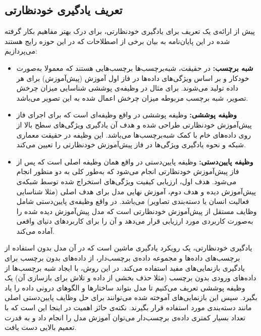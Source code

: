 \subsection{تعریف یادگیری خودنظارتی}

پیش از ارائه‌ی یک تعریف برای یادگیری خودنظارتی، برای درک بهتر مفاهیم بکار گرفته شده در این پایان‌نامه به بیان برخی از اصطلاحات که در این حوزه رایج هستند می‌پردازیم:

\begin{itemize}
    \item \textbf{شبه برچسب:}
    در حقیقت، شبه‌برچسب‌ها برچسب‌هایی هستند که معمولا به‌صورت خودکار و بر اساس ویژگی‌های داده‌ها در فاز اول آموزش (پیش‌آموزش) برای هر داده تولید می‌شوند. برای مثال در وظیفه‌ی پوششی شناسایی میزان چرخش تصویر، شبه برچسب مربوطه میزان چرخش اعمال شده به این تصویر می‌باشد.
    \item \textbf{وظیفه پوششی:}
    وظیفه پوششی در واقع وظیفه‌ای است که برای اجرای فاز پیش‌آموزش خودنظارتی طراحی شده و هدف آن یادگیری ویژگی‌های سطح بالا از روی داده‌های خام با کمک شبه‌برچسب‌ها می‌باشد. این وظیفه در حقیقت معماری شبکه و نحوه یادگیری ویژگی‌ها در فاز پیش‌آموزش خودنظارتی را تعیین می‌کند.
    \item \textbf{وظیفه پایین‌دستی:}
    وظیفه پایین‌دستی در واقع همان وظیفه اصلی است که پس از فاز پیش‌آموزش خودنظارتی انجام می‌شود که به‌طور کلی به دو منظور انجام می‌شود. هدف اول، ارزیابی کیفیت ویژگی‌های استخراج شده توسط شبکه‌ی پیش‌آموزش دیده و هدف دوم، آموزش نهایی مدل برای هدف اصلی (مثلا شناسایی فعالیت انسان یا دسته‌بندی تصاویر) می‌باشد. در واقع وظیفه‌ی پایین‌دستی شامل وظایف مستقل از پیش‌آموزش خودنظارتی است که مدل پیش‌آموزش دیده شده را به‌صورت کاربردی مورد ارزیابی قرار می‌دهد و آن را برای کاربردهای دنیای واقعی آماده می‌کند.
\end{itemize}

یادگیری خودنظارتی، یک رویکرد یادگیری ماشین است که در آن مدل بدون استفاده از برچسب‌های داده‌ها و مجموعه داده‌ی برچسب‌دار، از داده‌های بدون برچسب برای یادگیری بازنمایی‌های مفید استفاده می‌کند. در این روش، با ایجاد شبه برچسب‌ها از داده‌های ورودی بدون برچسب (مثلا حذف بخشی از داده و تلاش برای بازسازی آن) یک وظیفه پوششی تعریف می‌کنیم تا مدل بتواند ساختارها و الگوهای درونی داده را یاد بگیرد. سپس این بازنمایی‌های آموخته شده می‌توانند برای حل وظایف پایین‌دستی اصلی مانند دسته‌بندی مورد استفاده قرار بگیرند. نکته‌ی حائز اهمیت در اینجا این است که با تعداد بسیار کمتری داده‌ی برچسب‌دار می‌توان آموزش مدل را انجام داد و به قدرت تعمیم بالایی دست یافت.


